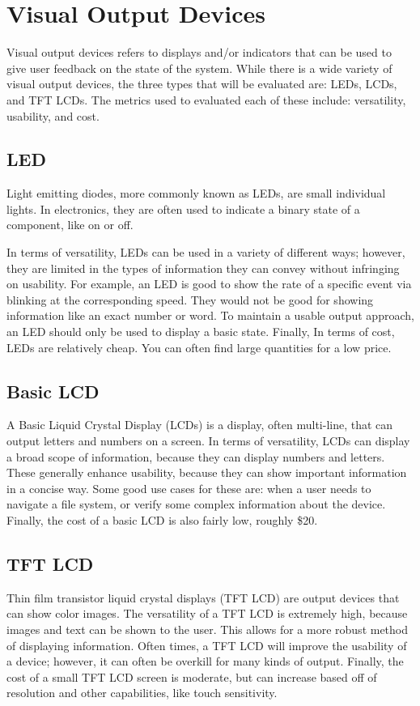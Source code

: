 \section{Visual Output Devices}
    Visual output devices refers to displays and/or indicators that can be used to give user feedback on the state of the system.
    While there is a wide variety of visual output devices, the three types that will be evaluated are: LEDs, LCDs, and TFT LCDs. 
    The metrics used to evaluated each of these include: versatility, usability, and cost.
    \subsection{LED}
    Light emitting diodes, more commonly known as LEDs, are small individual lights. In electronics, they are often used to indicate a binary state of a component, like on or off. 
    
    In terms of versatility, LEDs can be used in a variety of different ways; however, they are limited in the types of information they can convey without infringing on usability.
    For example, an LED is good to show the rate of a specific event via blinking at the corresponding speed.
    They would not be good for showing information like an exact number or word.
    To maintain a usable output approach, an LED should only be used to display a basic state.
    Finally, In terms of cost, LEDs are relatively cheap. You can often find large quantities for a low price. 
    
    \subsection{Basic LCD}
    A Basic Liquid Crystal Display (LCDs) is a display, often multi-line, that can output letters and numbers on a screen.
    In terms of versatility, LCDs can display a broad scope of information, because they can display numbers and letters.
    These generally enhance usability, because they can show important information in a concise way.
    Some good use cases for these are: when a user needs to navigate a file system, or verify some complex information about the device.
    Finally, the cost of a basic LCD is also fairly low, roughly \$20.
    
    \subsection{TFT LCD}
    Thin film transistor liquid crystal displays (TFT LCD) are output devices that can show color images.
    The versatility of a TFT LCD is extremely high, because images and text can be shown to the user.
    This allows for a more robust method of displaying information.
    Often times, a TFT LCD will improve the usability of a device; however, it can often be overkill for many kinds of output.
    Finally, the cost of a small TFT LCD screen is moderate, but can increase based off of resolution and other capabilities, like touch sensitivity.
    
